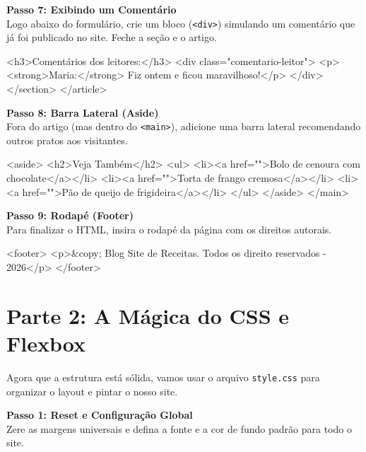 \documentclass[12pt,a4paper]{article}
\begin{document}
\noindent\textbf{Passo 7: Exibindo um Comentário}\\
Logo abaixo do formulário, crie um bloco (\verb|<div>|) simulando um comentário que já foi publicado no site. Feche a seção e o artigo.

\begin{codehtml}
                    <h3>Comentários dos leitores:</h3>
                    <div class="comentario-leitor">
                        <p><strong>Maria:</strong> Fiz ontem e ficou maravilhoso!</p>
                    </div>
                </section>
            </article>
\end{codehtml}

\noindent\textbf{Passo 8: Barra Lateral (Aside)}\\
Fora do artigo (mas dentro do \verb|<main>|), adicione uma barra lateral recomendando outros pratos aos visitantes.

\begin{codehtml}
            <aside>
                <h2>Veja Também</h2>
                <ul>
                    <li><a href="">Bolo de cenoura com chocolate</a></li>
                    <li><a href="">Torta de frango cremosa</a></li>
                    <li><a href="">Pão de queijo de frigideira</a></li>
                </ul>
            </aside>
        </main>
\end{codehtml}

\noindent\textbf{Passo 9: Rodapé (Footer)}\\
Para finalizar o HTML, insira o rodapé da página com os direitos autorais.

\begin{codehtml}
        <footer>
            <p>&copy; Blog Site de Receitas. Todos os direito reservados - 2026</p>
        </footer>
\end{codehtml}

\newpage

\section*{Parte 2: A Mágica do CSS e Flexbox}
Agora que a estrutura está sólida, vamos usar o arquivo \verb|style.css| para organizar o layout e pintar o nosso site.

\vspace{0.25cm}
\noindent\textbf{Passo 1: Reset e Configuração Global}\\
Zere as margens universais e defina a fonte e a cor de fundo padrão para todo o site.
\end{document}
